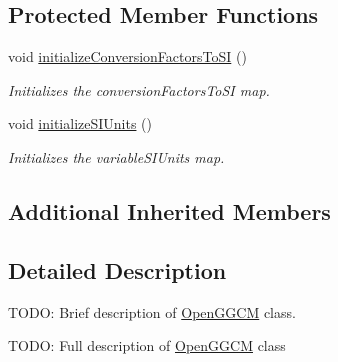 \subsection*{Protected Member Functions}
\begin{DoxyCompactItemize}
\item 
void \hyperlink{classccmc_1_1_open_g_g_c_m_ad0eab5a6039fba2eb809a3f7ab555676}{initialize\-Conversion\-Factors\-To\-S\-I} ()
\begin{DoxyCompactList}\small\item\em Initializes the conversion\-Factors\-To\-S\-I map.  \end{DoxyCompactList}\item 
void \hyperlink{classccmc_1_1_open_g_g_c_m_a70edfe6a76c0f2e72ae47cae5f7e35ae}{initialize\-S\-I\-Units} ()
\begin{DoxyCompactList}\small\item\em Initializes the variable\-S\-I\-Units map.  \end{DoxyCompactList}\end{DoxyCompactItemize}
\subsection*{Additional Inherited Members}


\subsection{Detailed Description}
T\-O\-D\-O\-: Brief description of \hyperlink{classccmc_1_1_open_g_g_c_m}{Open\-G\-G\-C\-M} class. 

T\-O\-D\-O\-: Full description of \hyperlink{classccmc_1_1_open_g_g_c_m}{Open\-G\-G\-C\-M} class 

